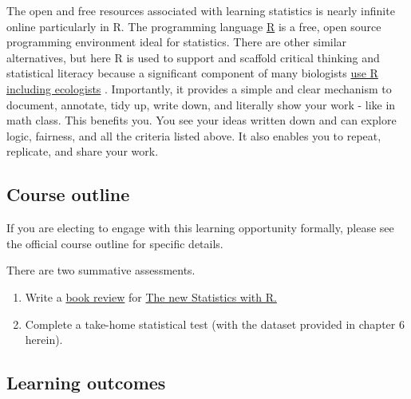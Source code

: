 \documentclass[
]{book}
\providecommand{\tightlist}{%
  \setlength{\itemsep}{0pt}\setlength{\parskip}{0pt}}
\begin{document}
The open and free resources associated with learning statistics is nearly infinite online particularly in R. The programming language \href{https://www.r-project.org}{R} is a free, open source programming environment ideal for statistics. There are other similar alternatives, but here R is used to support and scaffold critical thinking and statistical literacy because a significant component of many biologists \href{https://esajournals.onlinelibrary.wiley.com/doi/full/10.1002/ecs2.2567}{use R including ecologists} \citep{RN6098}. Importantly, it provides a simple and clear mechanism to document, annotate, tidy up, write down, and literally show your work - like in math class. This benefits you. You see your ideas written down and can explore logic, fairness, and all the criteria listed above. It also enables you to repeat, replicate, and share your work.

\hypertarget{course-outline}{%
\subsection*{Course outline}\label{course-outline}}

If you are electing to engage with this learning opportunity formally, please see the official course outline for specific details.

There are two summative assessments.

\begin{enumerate}
\def\labelenumi{\arabic{enumi}.}
\tightlist
\item
  Write a \href{https://journals.plos.org/ploscompbiol/article?id=10.1371/journal.pcbi.1006562}{book review} for \href{https://global.oup.com/academic/product/the-new-statistics-with-r-9780198798187?cc=us\&lang=en\&}{The new Statistics with R.}\\
\item
  Complete a take-home statistical test (with the dataset provided in chapter 6 herein).
\end{enumerate}

\hypertarget{learning-outcomes}{%
\subsection*{Learning outcomes}\label{learning-outcomes}}
\end{document}
